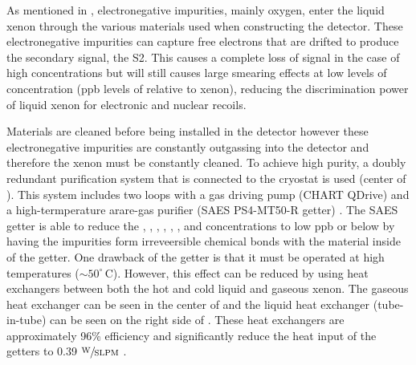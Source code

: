  As mentioned in , electronegative impurities, mainly oxygen, enter the liquid xenon through the various materials used when constructing the detector.  These electronegative impurities can capture free electrons that are drifted to produce the secondary signal, the S2.  This causes a complete loss of signal in the case of high concentrations but will still causes large smearing effects at low levels of concentration (ppb levels of  relative to xenon), reducing the discrimination power of liquid xenon for electronic and nuclear recoils.
 
Materials are cleaned before being installed in the detector however these electronegative impurities are constantly outgassing into the detector and therefore the xenon must be constantly cleaned.  To achieve high purity, a doubly redundant purification system that is connected to the cryostat is used (center of ).  This system includes two loops with a gas driving pump (CHART QDrive) and a high-termperature arare-gas purifier (SAES PS4-MT50-R getter) \cite{aprile2017xenon1t}.  The SAES getter is able to reduce the , , , , , , and  concentrations to low ppb or below by having the impurities form irreveersible chemical bonds with the material inside of the getter.  One drawback of the getter is that it must be operated at high temperatures ($\sim 50^{\circ} \, \textrm{C}$).  However, this effect can be reduced by using heat exchangers between both the hot and cold liquid and gaseous xenon.  The gaseous heat exchanger can be seen in the center of   and the liquid heat exchanger (tube-in-tube) can be seen on the right side of .  These heat exchangers are approximately 96\% efficiency and significantly reduce the heat input of the getters to 0.39 $\sfrac{\textrm{W}}{\textrm{SLPM}}$ \cite{aprile2017xenon1t}.

 
 
 \subsubsection{}
  \label{sec:xe1t_pur_kr85}
 
